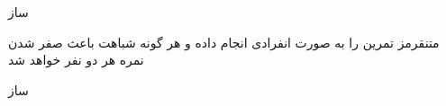 \documentclass[]{assignment}
\begin{document}
‌ساز

‌متن{قرمز}
{
  تمرین را به صورت انفرادی انجام داده و هر گونه شباهت باعث صفر شدن نمره هر دو نفر خواهد شد
}


‌ساز
\end{document}
